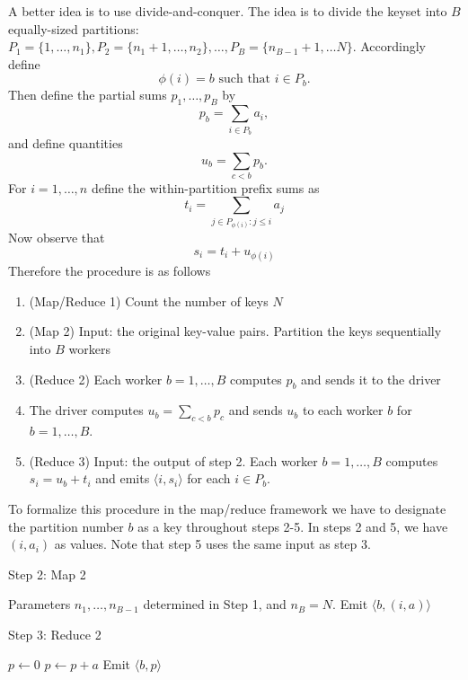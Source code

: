 \documentclass[11pt]{article}
\begin{document}
A better idea is to use divide-and-conquer.  The idea is to divide the
keyset into $B$ equally-sized partitions: $P_1 = \{1,\hdots, n_1\},
P_2 = \{n_1 + 1, \hdots, n_2\}, \hdots, P_B = \{n_{B-1} + 1, \hdots
N\}$.  Accordingly define 
\[\phi(i) = b \text{ such that } i \in P_b .\]
Then define the partial sums $p_1,\hdots, p_B$ by 
\[ p_b = \sum_{i \in P_b} a_i ,\]
and define quantities
\[
u_b = \sum_{c < b} p_b .
\]
For $i = 1, \hdots, n$ define the within-partition prefix sums as
\[
t_i = \sum_{j \in P_{\phi(i)}: j \leq i} a_j
\]
Now observe that
\[
s_i = t_i + u_{\phi(i)}
\]
Therefore the procedure is as follows
\begin{enumerate}
\item (Map/Reduce 1) Count the number of keys $N$
\item (Map 2) Input: the original key-value pairs. Partition the keys
  sequentially into $B$ workers
\item (Reduce 2) Each worker $b = 1,\hdots, B$ computes $p_b$ and sends it to the driver
\item The driver computes $u_b = \sum_{c < b} p_c$ and sends $u_b$ to
  each worker $b$ for $b = 1,\hdots, B$.
\item (Reduce 3) Input: the output of step 2. Each worker $b = 1,\hdots, B$ computes $s_i = u_b + t_i$ and
  emits $\langle i, s_i \rangle$ for each $i \in P_b$.
\end{enumerate}

To formalize this procedure in the map/reduce framework we have to
designate the partition number $b$ as a key throughout steps 2-5.
In steps 2 and 5, we have $(i, a_i)$ as values.
Note that step 5 uses the same input as step 3.

\begin{algorithm}[H]
\caption{Step 2: Map 2}
\begin{algorithmic}
\State Parameters $n_1,\hdots, n_{B-1}$ determined in Step 1, and $n_B = N$.
      \State Emit $\langle b, (i, a) \rangle$
      \State \Return
    \EndIf
  \EndFor
\EndFunction
\end{algorithmic}
\end{algorithm}

\begin{algorithm}[H]
\caption{Step 3: Reduce 2}
\begin{algorithmic}
  \State $p \leftarrow 0$
    \State $p \leftarrow p + a$
  \EndFor
  \State Emit $\langle b, p \rangle$
\EndFunction
\end{algorithmic}
\end{algorithm}
\end{document}

